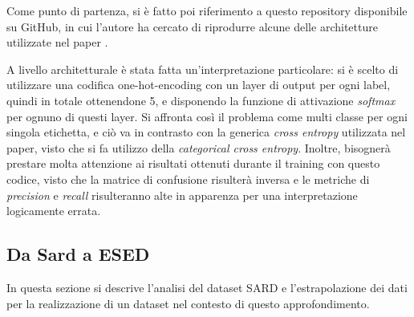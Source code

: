 \documentclass[conference]{IEEEtran}
\begin{document}
Come punto di partenza, si è fatto poi riferimento a questo repository\cite{Ykartal2024} disponibile su GitHub, in cui l'autore ha cercato di riprodurre alcune delle architetture utilizzate nel paper \cite{russell2018automatedvulnerabilitydetectionsource}. 

A livello architetturale è stata fatta un'interpretazione particolare: si è scelto di utilizzare una codifica one-hot-encoding con un layer di output per ogni label, quindi in totale ottenendone 5, e disponendo la funzione di attivazione \textit{softmax} per ognuno di questi layer. Si affronta così il problema come multi classe per ogni singola etichetta, e ciò va in contrasto con la generica \textit{cross entropy} utilizzata nel paper, visto che si fa utilizzo della \textit{categorical cross entropy}. Inoltre, bisognerà prestare molta attenzione ai risultati ottenuti durante il training con questo codice, visto che la matrice di confusione risulterà inversa e le metriche di \textit{precision} e \textit{recall} risulteranno alte in apparenza per una interpretazione logicamente errata.

\subsection{Da Sard a ESED}

In questa sezione si descrive l'analisi del dataset SARD e l'estrapolazione dei dati per la realizzazione di un dataset nel contesto di questo approfondimento.
\end{document}
